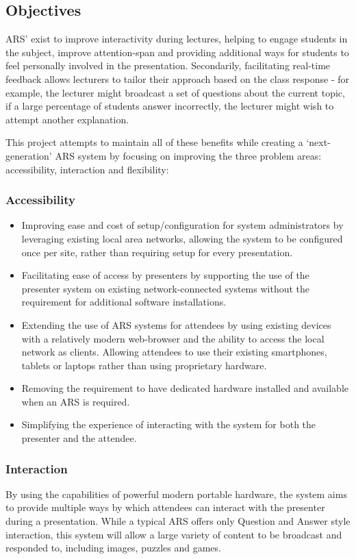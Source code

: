\documentclass[a4papert,11pt,notitlepage]{ltxdoc}
\begin{document}
\subsection{Objectives}
ARS' exist to improve interactivity during lectures, helping to engage students in the subject, improve attention-span and providing additional ways for students to feel personally involved in the presentation. Secondarily, facilitating real-time feedback allows lecturers to tailor their approach based on the class response - for example, the lecturer might broadcast a set of questions about the current topic, if a large percentage of students answer incorrectly, the lecturer might wish to attempt another explanation. 

This project attempts to maintain all of these benefits while creating a `next-generation' ARS system by focusing on improving the three problem areas: accessibility, interaction and flexibility:

\subsubsection{Accessibility}
\begin{itemize}
\item Improving ease and cost of setup/configuration for system administrators by leveraging existing local area networks, allowing the system to be configured once per site, rather than requiring setup for every presentation.
\item Facilitating ease of access by presenters by supporting the use of the presenter system on existing network-connected systems without the requirement for additional software installations.
\item Extending the use of ARS systems for attendees by using existing devices with a relatively modern web-browser and the ability to access the local network as clients. Allowing attendees to use their existing smartphones, tablets or laptops rather than using proprietary hardware.
\item Removing the requirement to have dedicated hardware installed and available when an ARS is required.
\item Simplifying the experience of interacting with the system for both the presenter and the attendee.
\end{itemize}

\subsubsection{Interaction}
By using the capabilities of powerful modern portable hardware, the system aims to provide multiple ways by which attendees can interact with the presenter during a presentation. While a typical ARS offers only Question and Answer style interaction, this system will allow a large variety of content to be broadcast and responded to, including images, puzzles and games.
\end{document}
